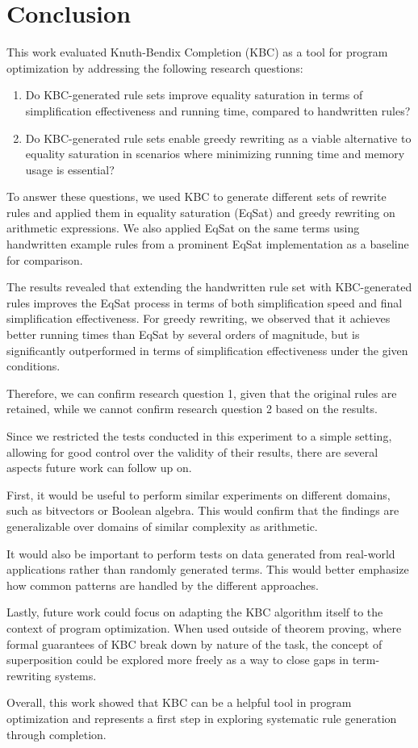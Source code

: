 \chapter{Conclusion}
\label{chap:conclusion}

This work evaluated Knuth-Bendix Completion (KBC) as a tool for program optimization by addressing the following research questions:
\begin{enumerate}
	\item Do KBC-generated rule sets improve equality saturation in terms of simplification effectiveness and running time, compared to handwritten rules?
	\item Do KBC-generated rule sets enable greedy rewriting as a viable alternative to equality saturation in scenarios where minimizing running time and memory usage is essential?
\end{enumerate}

To answer these questions, we used KBC to generate different sets of rewrite rules and applied them in equality saturation (EqSat) and greedy rewriting on arithmetic expressions. We also applied EqSat on the same terms using handwritten example rules from a prominent EqSat implementation as a baseline for comparison.

The results revealed that extending the handwritten rule set with KBC-generated rules improves the EqSat process in terms of both simplification speed and final simplification effectiveness. For greedy rewriting, we observed that it achieves better running times than EqSat by several orders of magnitude, but is significantly outperformed in terms of simplification effectiveness under the given conditions. 

Therefore, we can confirm research question 1, given that the original rules are retained, while we cannot confirm research question 2 based on the results.

Since we restricted the tests conducted in this experiment to a simple setting, allowing for good control over the validity of their results, there are several aspects future work can follow up on.

First, it would be useful to perform similar experiments on different domains, such as bitvectors or Boolean algebra. This would confirm that the findings are generalizable over domains of similar complexity as arithmetic.

It would also be important to perform tests on data generated from real-world applications rather than randomly generated terms. This would better emphasize how common patterns are handled by the different approaches.

Lastly, future work could focus on adapting the KBC algorithm itself to the context of program optimization. When used outside of theorem proving, where formal guarantees of KBC break down by nature of the task, the concept of superposition could be explored more freely as a way to close gaps in term-rewriting systems.

Overall, this work showed that KBC can be a helpful tool in program optimization and represents a first step in exploring systematic rule generation through completion.